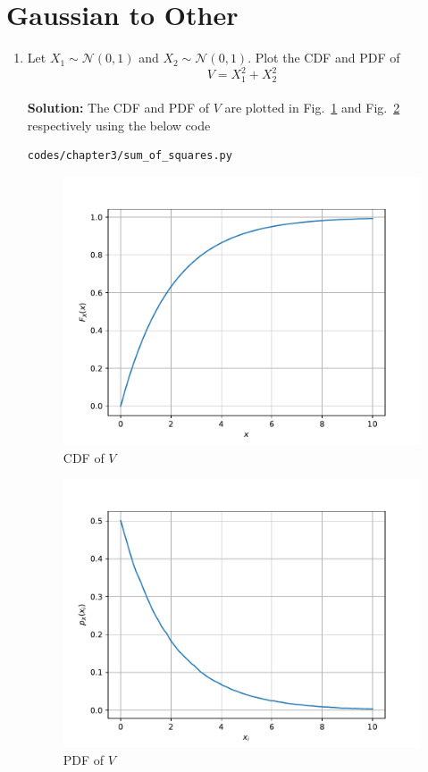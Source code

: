 \documentclass[journal,10pt,twocolumn]{IEEEtran}
\newcommand\figref{Fig.~\ref}
\newcommand{\solution}{\noindent \textbf{Solution: }}
\providecommand{\gauss}[2]{\mathcal{N}\ensuremath{\left(#1,#2\right)}}
\begin{document}
\section{Gaussian to Other}
\begin{enumerate}
\item
Let $X_1 \sim  \gauss{0}{1}$ and $X_2 \sim  \gauss{0}{1}$. Plot the CDF and PDF of
%
\begin{equation}
V = X_1^2 + X_2^2
\end{equation}\\
\solution The CDF and PDF of $V$ are plotted in \figref{fig:chisq_cdf} and \figref{fig:chisq_pdf} respectively using the below code
\begin{lstlisting}
codes/chapter3/sum_of_squares.py
\end{lstlisting}
\begin{figure}[H]
\centering
\includegraphics[width=\columnwidth]{./figs/chapter4/chisq_cdf.pdf}
\caption{CDF of $V$}
\label{fig:chisq_cdf}
\end{figure}
\begin{figure}[H]
\centering
\includegraphics[width=\columnwidth]{./figs/chapter4/chisq_pdf.pdf}
\caption{PDF of $V$}
\label{fig:chisq_pdf}
\end{figure}
%


\end{enumerate}
\end{document}

